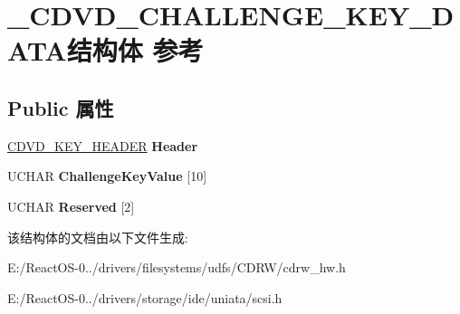 \hypertarget{struct___c_d_v_d___c_h_a_l_l_e_n_g_e___k_e_y___d_a_t_a}{}\section{\+\_\+\+C\+D\+V\+D\+\_\+\+C\+H\+A\+L\+L\+E\+N\+G\+E\+\_\+\+K\+E\+Y\+\_\+\+D\+A\+T\+A结构体 参考}
\label{struct___c_d_v_d___c_h_a_l_l_e_n_g_e___k_e_y___d_a_t_a}
\subsection*{Public 属性}
\begin{DoxyCompactItemize}
\item 
\mbox{\label{struct___c_d_v_d___c_h_a_l_l_e_n_g_e___k_e_y___d_a_t_a_a1c94800723aebbf1263691b330fb5bcd}} 
\hyperlink{struct___c_d_v_d___k_e_y___h_e_a_d_e_r}{C\+D\+V\+D\+\_\+\+K\+E\+Y\+\_\+\+H\+E\+A\+D\+ER} {\bfseries Header}
\item 
\mbox{\label{struct___c_d_v_d___c_h_a_l_l_e_n_g_e___k_e_y___d_a_t_a_a29760e29251400e1bd166fd10e8f991a}} 
U\+C\+H\+AR {\bfseries Challenge\+Key\+Value} \mbox{[}10\mbox{]}
\item 
\mbox{\label{struct___c_d_v_d___c_h_a_l_l_e_n_g_e___k_e_y___d_a_t_a_a97db3df24544a73d81cffaf45bce7cc1}} 
U\+C\+H\+AR {\bfseries Reserved} \mbox{[}2\mbox{]}
\end{DoxyCompactItemize}


该结构体的文档由以下文件生成\+:\begin{DoxyCompactItemize}
\item 
E\+:/\+React\+O\+S-\/0../drivers/filesystems/udfs/\+C\+D\+R\+W/cdrw\+\_\+hw.\+h\item 
E\+:/\+React\+O\+S-\/0../drivers/storage/ide/uniata/scsi.\+h\end{DoxyCompactItemize}
